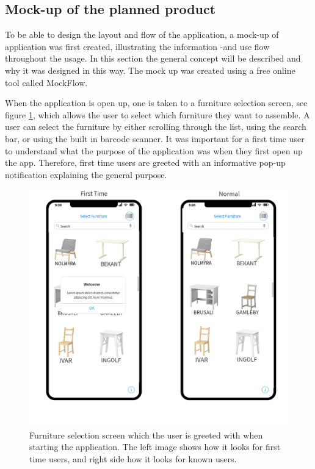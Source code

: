 \subsection{Mock-up of the planned product}
To be able to design the layout and flow of the application, a mock-up of application was first created, illustrating the information -and use flow throughout the usage. In this section the general concept will be described and why it was designed in this way. The mock up was created using a free online tool called MockFlow\cite{mockflow}. 

When the application is open up, one is taken to a furniture selection screen, see figure \ref{fig:furniture-select}, which allows the user to select which furniture they want to assemble. A user can select the furniture by either scrolling through the list, using the search bar, or using the built in barcode scanner. It was important for a first time user to understand what the purpose of the application was when they first open up the app. Therefore, first time users are greeted with an informative pop-up notification explaining the general purpose.

\begin{figure}[hbtp]
\begin{center}
\includegraphics[height = 0.4\textheight]{./Images/Furniture_Select.png}
\caption{Furniture selection screen which the user is greeted with when starting the application. The left image shows how it looks for first time users, and right side how it looks for known users.}
\label{fig:furniture-select}
\end{center}
\end{figure}

